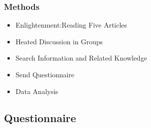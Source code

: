 \begin{frame}
    \frametitle{Methods}
    \Large
    \begin{itemize}[<+->]
        \item Enlightenment:Reading Five Articles
        \item Heated Discussion in Groups
        \item Search Information and Related Knowledge
        \item Send Questionnaire
        \item Data Analysis
    \end{itemize}
\end{frame}

\subsection{Questionnaire}
